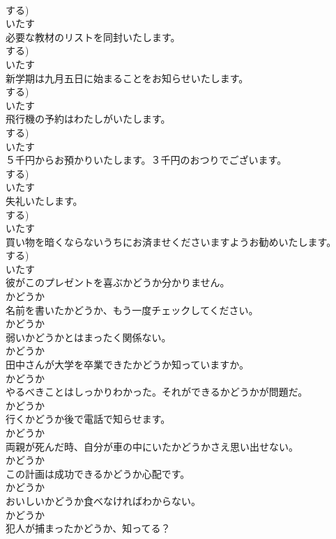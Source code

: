 \documentclass[8pt]{extreport}
\begin{document}
\begin{CJK}{UTF8}{min}
\\	する)	
\\	いたす
\\	必要な教材のリストを同封いたします。	
\\	する)	
\\	いたす
\\	新学期は九月五日に始まることをお知らせいたします。	
\\	する)	
\\	いたす
\\	飛行機の予約はわたしがいたします。	
\\	する)	
\\	いたす
\\	５千円からお預かりいたします。３千円のおつりでございます。	
\\	する)	
\\	いたす
\\	失礼いたします。	
\\	する)	
\\	いたす
\\	買い物を暗くならないうちにお済ませくださいますようお勧めいたします。	
\\	する)	
\\	いたす
\\	彼がこのプレゼントを喜ぶかどうか分かりません。	
\\	かどうか
\\	名前を書いたかどうか、もう一度チェックしてください。	
\\	かどうか
\\	弱いかどうかとはまったく関係ない。	
\\	かどうか
\\	田中さんが大学を卒業できたかどうか知っていますか。	
\\	かどうか
\\	やるべきことはしっかりわかった。それができるかどうかが問題だ。	
\\	かどうか
\\	行くかどうか後で電話で知らせます。	
\\	かどうか
\\	両親が死んだ時、自分が車の中にいたかどうかさえ思い出せない。	
\\	かどうか
\\	この計画は成功できるかどうか心配です。	
\\	かどうか
\\	おいしいかどうか食べなければわからない。	
\\	かどうか
\\	犯人が捕まったかどうか、知ってる？	

\end{CJK}
\end{document}
